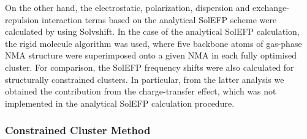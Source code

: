 \documentclass[b5paper,oneside,fleqn,11pt]{book}
\begin{document}
\begin{appendices}
\begin{refsection}
On the other
hand, the electrostatic, polarization, dispersion and exchange\hyp{}repulsion
interaction terms based on the analytical SolEFP scheme
were calculated by using {\sc Solvshift}. In the
case of the analytical SolEFP calculation, the rigid molecule
algorithm \citep{Blasiak.Lee.Cho.JCP.2013} 
was used, where five backbone atoms of gas-phase
NMA structure were superimposed onto a given NMA
in each fully optimised cluster. For comparison, the SolEFP
frequency shifts were also calculated for structurally constrained
clusters. In particular, from the latter analysis we
obtained the contribution from the charge\hyp{}transfer effect,
which was not implemented in the analytical SolEFP calculation
procedure. 

\subsubsection{Constrained Cluster Method\label{a:constrained-models}}


\end{refsection}
\end{appendices}
\end{document}
